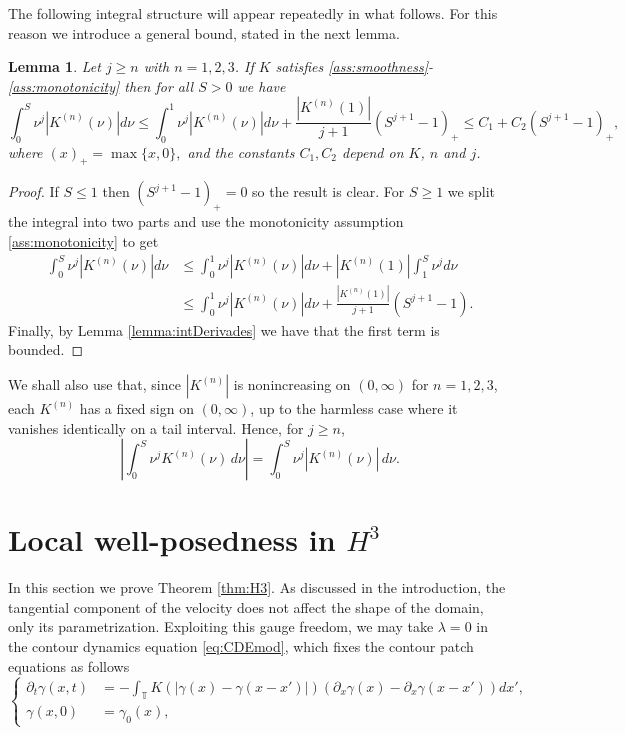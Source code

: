 \documentclass[a4paper]{amsart}
\newtheorem{lemma}[theorem]{Lemma}
\theoremstyle{definition}
\newcommand{\T}{\ensuremath{\mathbb{T}}}
\begin{document}
The following integral structure will appear repeatedly in what follows. For this reason we introduce a general bound, stated in the next lemma.

\begin{lemma} \label{lemma:canviVar}
     Let $j\geq n$ with $n=1,2,3$. If $K$ satisfies \ref{ass:smoothness}-\ref{ass:monotonicity} then for all $S>0$ we have 
     \begin{equation*}
         \int_0^S \nu^j |K^{(n)}(\nu)|d\nu \leq \int_0^1 \nu^j |K^{(n)}(\nu)| d\nu + \frac{|K^{(n)}(1)|}{j+1}(S^{j+1}-1)_+ \leq C_1 + C_2(S^{j+1}-1)_+,
     \end{equation*}
     where $(x)_+=\max\{x,0\},$ and the constants $C_1, C_2$ depend on $K$, $n$ and $j$.
\end{lemma}

\begin{proof}
    If $S\leq 1$ then $(S^{j+1}-1)_+=0$ so the result is clear. For $S\geq 1$ we split the integral into two parts and use the monotonicity assumption \ref{ass:monotonicity} to get
    \begin{align*}
        \int_0^S \nu^j |K^{(n)}(\nu)|d\nu &\leq \int_0^1 \nu^j |K^{(n)}(\nu)| d\nu + |K^{(n)}(1)| \int_1^S \nu^j  d\nu \\
        & \leq \int_0^1 \nu^j |K^{(n)}(\nu)| d\nu + \frac{|K^{(n)}(1)|}{j+1}(S^{j+1}-1).
    \end{align*}
    Finally, by Lemma \ref{lemma:intDerivades} we have that the first term is bounded.
\end{proof}

We shall also use that, since \(|K^{(n)}|\) is nonincreasing on \((0,\infty)\) for
\(n=1,2,3\), each \(K^{(n)}\) has a fixed sign on \((0,\infty)\), up to the harmless
case where it vanishes identically on a tail interval. Hence, for \(j\ge n\),
\[
\left|\int_0^S \nu^j K^{(n)}(\nu)\,d\nu\right|
=
\int_0^S \nu^j |K^{(n)}(\nu)|\,d\nu .
\]


\section{\texorpdfstring{Local well-posedness in $H^3$}{Local well-posedness in H3}}\label{sec:H3}
In this section we prove Theorem \ref{thm:H3}. As discussed in the introduction, the tangential component of the velocity does not affect the shape of the domain, only its parametrization. Exploiting this gauge freedom, we may take \(\lambda = 0\) in the contour dynamics equation \eqref{eq:CDEmod}, which fixes the contour patch equations as follows
\begin{equation}\label{eq:patch}
    \left\{\begin{aligned}
        \partial_t \gamma(x,t) &= -\int_\T K(|\gamma(x)-\gamma(x-x')|)(\partial_x \gamma(x)-\partial_x \gamma(x-x'))dx',\\ 
        \gamma(x,0)&= \gamma_0(x),
    \end{aligned}\right.
\end{equation}
\end{document}
